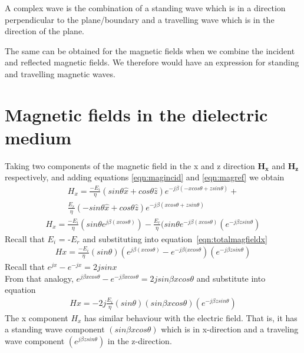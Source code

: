 A complex wave is the combination of a standing wave which is in a direction perpendicular to the plane/boundary and a travelling wave which is in the direction of the plane.

The same can be obtained for the magnetic fields when we combine the incident and reflected magnetic fields. We therefore
would have an expression for standing and travelling magnetic waves.

\section{Magnetic fields in the dielectric medium}
Taking two components of the magnetic field in the x and z direction
$\boldsymbol{H_x}$ and $\boldsymbol{H_z}$ respectively, and adding equations \ref{eqn:magincid} and \ref{eqn:magref} we obtain
\begin{align*}
H_x = \frac{-E_i}{\eta} (sin\theta \hat{x} + cos\theta \hat{z}) e^{-j\beta( -xcos\theta + zsin\theta)} +\\ 
\frac{E_r}{\eta} \left(-sin\theta \hat{x} + cos\theta \hat{z}\right) e^{-j\beta( xcos\theta + zsin\theta)}
\end{align*}
\begin{align}
H_x = \frac{-E_i}{\eta}(sin\theta e^{j\beta( xcos\theta)} ) - \frac{E_r}{\eta}(sin\theta e^{-j\beta( xcos\theta)} (e^{-j\beta zsin\theta})
\label{eqn:totalmagfieldx}
\end{align}
Recall that $E_i$ = -$E_r$ and substituting into equation~\ref{eqn:totalmagfieldx}
\begin{align}
Hx = \frac{-E_i}{\eta}(sin\theta)( e^{j\beta( xcos\theta)} - e^{-j\beta( xcos\theta}) (e^{-j\beta zsin\theta})
\label{eqn:totalmagfieldx2}
\end{align}
Recall that $e^{jx} - e^{-jx} = 2jsinx$ \\
From that analogy, $e^{j\beta xcos\theta} - e^{-j\beta xcos\theta} = 2jsin\beta xcos\theta$ and substitute into
equation~
\begin{align}
Hx =  -2j \frac{E_i}{\eta}(sin\theta)( sin\beta xcos\theta) (e^{-j\beta zsin\theta})
\end{align} 
The x component $H_x$ has similar behaviour with the electric field. That is, it has a standing wave component $(sin\beta xcos\theta)$ which is in x-direction and a traveling wave component $(e^{j\beta zsin\theta})$ in the z-direction.

